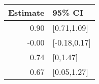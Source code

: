 \begin{tabular}{rl}
  \hline
Estimate & 95\% CI \\ 
  \hline
0.90 & [0.71,1.09] \\ 
  -0.00 & [-0.18,0.17] \\ 
  0.74 & [0,1.47] \\ 
  0.67 & [0.05,1.27] \\ 
   \hline
\end{tabular}


